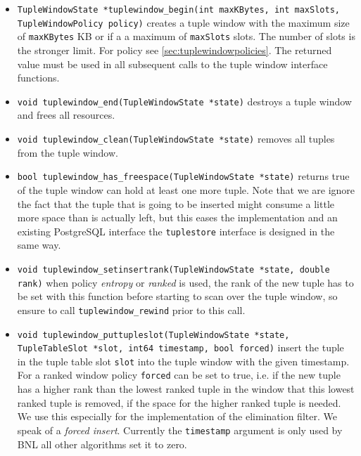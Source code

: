 \begin{itemize}
\item \lstinline|TupleWindowState *tuplewindow_begin(int maxKBytes, int maxSlots, TupleWindowPolicy policy)|
creates a tuple window with the maximum size of \lstinline|maxKBytes|
KB or if a a maximum of \lstinline|maxSlots| slots. The number of
slots is the stronger limit. For policy see
\autoref{sec:tuplewindowpolicies}.  The returned value must be
used in all subsequent calls to the tuple window interface functions.

\item \lstinline|void tuplewindow_end(TupleWindowState *state)| 
destroys a tuple window and frees all resources.

\item \lstinline|void tuplewindow_clean(TupleWindowState *state)|
removes all tuples from the tuple window.

\item \lstinline|bool tuplewindow_has_freespace(TupleWindowState *state)|
returns true of the tuple window can hold at least one more tuple.
Note that we are ignore the fact that the tuple that is going to be
inserted might consume a little more space than is actually left, but
this eases the implementation and an existing PostgreSQL interface the
\lstinline|tuplestore| interface is designed in the same way.

\item \lstinline|void tuplewindow_setinsertrank(TupleWindowState *state, double rank)|
when policy \emph{entropy} or \emph{ranked} is used, the rank of the
new tuple has to be set with this function before starting to scan
over the tuple window, so ensure to call
\lstinline|tuplewindow_rewind| prior to this call.

\item \lstinline|void tuplewindow_puttupleslot(TupleWindowState *state, TupleTableSlot *slot, int64 timestamp, bool forced)|
insert the tuple in the tuple table slot \lstinline|slot| into the
tuple window with the given timestamp.  For a ranked window policy
\lstinline|forced| can be set to true, i.e. if the new tuple has a
higher rank than the lowest ranked tuple in the window that this
lowest ranked tuple is removed, if the space for the higher ranked
tuple is needed.  We use this especially for the implementation of the
elimination filter. We speak of a \emph{forced insert}.  Currently the \lstinline|timestamp| argument is only used
by BNL all other algorithms set it to zero.


\end{itemize}
